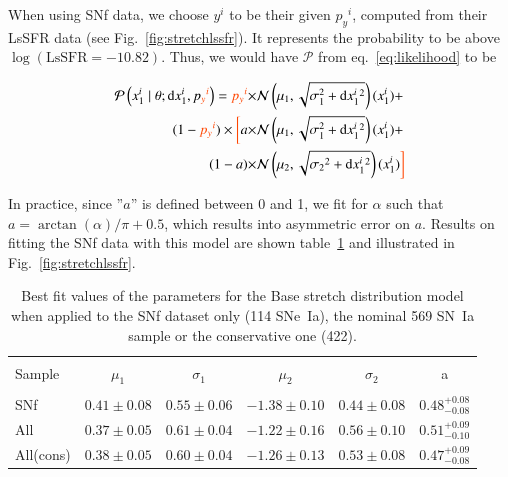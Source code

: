 \documentclass[]{aa} %
\newcommand{\mr}[1]{{\textcolor[rgb]{0.60,0.10,0.6}{#1}}}
\newcommand{\nn}[1]{{\textcolor[rgb]{1, 0.27, 0}{#1}}}
\newcommand{\prob}[2]{\mathcal{P}\left( #1 \mid #2\right)}
\begin{document}
\nn{When using SNf data, we choose $y^i$ to be their given $p_y{}^i$, computed
from their LsSFR data (see Fig.~\ref{fig:stretchlssfr}). \nn{It represents the
probability to be above $\log(\mathrm{LsSFR} = -10.82)$.} Thus, we would have
$\mathcal{P}$ from eq.~\ref{eq:likelihood} to be}

\begin{align}
    \label{eq:likelihoodsnf}
    \prob{x^{i}_{1}}{\theta; \mathrm{d}x^{i}_{1}, p\nn{_y{}^i}} =
    \nn{p_y{}^i} \times &\mathcal{N}\left(\mu_1,
    \sqrt{\sigma_{1}^{2}+\mathrm{d}x^{i}_{1}{}^{2}}\right)(x^{i}_{1}) +
    \nonumber\\
        (1-\nn{p_y{}^i}) \times \nn{\bigg[} a \times &
        \mathcal{N}\left(\mu_1,
        \sqrt{\sigma_{1}^{2}+\mathrm{d}x^{i}_{1}{}^{2}}\right)(x^{i}_{1}) +
        \nonumber\\
     (1-a) \times &\mathcal{N}\left(\mu_2,
 \sqrt{\sigma_2{}^{2}+\mathrm{d}x^{i}_{1}{}^{2}}\right)(x^{i}_{1}) \nn{\bigg]}
\end{align}

In practice, since ''$a$'' is defined between 0 and 1, we fit for $\alpha$ such
that $a=\arctan(\alpha)/\pi+0.5$, which results into asymmetric error on $a$.
\mr{Results on fitting the SNf data with this model are shown
table~\ref{tab:modelresults} and illustrated in Fig.~\ref{fig:stretchlssfr}.}

\begin{table}
    \centering
    \caption{Best fit values of the parameters for the Base stretch distribution
    model when applied to the SNf dataset only (114 SNe~Ia), the nominal 569
SN~Ia sample or the conservative one (422).}
    \label{tab:modelresults}
    \begin{tabular}{l c c c c c}
    \hline\hline\\[-0.8em]
        Sample & $\mu_1$  & $\sigma_1$ &$\mu_2$  & $\sigma_2$ & a \\[0.15em]
        \hline\\[-0.8em]
        SNf & $0.41 \pm 0.08$  & $0.55 \pm 0.06$ & $-1.38 \pm 0.10$ & $0.44 \pm 0.08$ & $0.48^{+0.08}_{-0.08}$ \\[0.15em]
        All & $0.37 \pm 0.05$  & $0.61 \pm 0.04$ & $-1.22 \pm 0.16$ & $0.56 \pm 0.10$ & $0.51^{+0.09}_{-0.10}$ \\[0.15em]
        All(cons) & $0.38 \pm 0.05$  & $0.60 \pm 0.04$ & $-1.26 \pm 0.13$ & $0.53 \pm 0.08$ & $0.47^{+0.09}_{-0.08}$ \\[0.15em]
        \hline
    \end{tabular}
\end{table}
\end{document}
